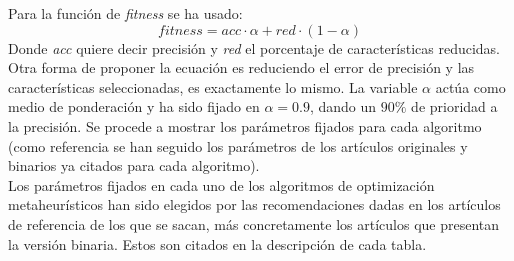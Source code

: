 Para la función de \textit{fitness} se ha usado:
\begin{equation}
    fitness = acc\cdot\alpha + red\cdot(1-\alpha)
    \label{eq:fitness}
\end{equation}
Donde \textit{acc} quiere decir precisión y \textit{red} el porcentaje de características reducidas. Otra forma de proponer la ecuación es reduciendo el error de precisión y las características seleccionadas, es exactamente lo mismo. La variable $\alpha$ actúa como medio de ponderación y ha sido fijado en $\alpha=0.9$, dando un $90\%$ de prioridad a la precisión.
Se procede a mostrar los parámetros fijados para cada algoritmo (como referencia se han seguido los parámetros de los artículos originales y binarios ya citados para cada algoritmo).\\[6pt]
Los parámetros fijados en cada uno de los algoritmos de optimización metaheurísticos han sido elegidos por las recomendaciones dadas en los artículos de referencia de los que se sacan, más concretamente los artículos que presentan la versión binaria. Estos son citados en la descripción de cada tabla.

